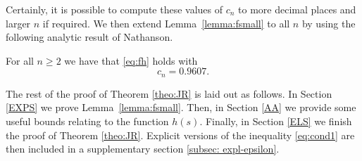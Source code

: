 \documentclass[12pt]{amsart}
\begin{document}
Certainly, it is possible to compute these values of $c_n$ to more decimal places and larger $n$ if required. We then extend Lemma~\ref{lemma:fsmall} to all $n$ by using the following analytic result of Nathanson.
\begin{lemma}\label{lemma:f_n}
    For all $n\ge 2$ we have that \eqref{eq:fh} holds with
    \begin{equation*}
        c_n=0.9607.
    \end{equation*}
\end{lemma}
The rest of the proof of Theorem \ref{theo:JR} is laid out as follows. In Section \ref{EXPS} we prove Lemma~\ref{lemma:fsmall}. Then, in Section \ref{AA} we provide some useful bounds relating to the function $h(s)$. Finally, in Section \ref{ELS} we finish the proof of Theorem \ref{theo:JR}. Explicit versions of the inequality \eqref{eq:cond1} are then included in a supplementary section \ref{subsec: expl-epsilon}.
\end{document}

